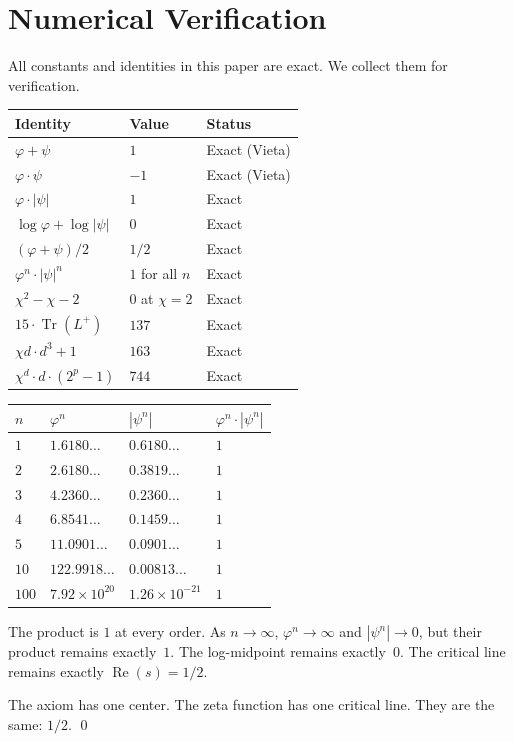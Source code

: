 \documentclass[12pt, a4paper]{article}
\theoremstyle{plain}
\theoremstyle{definition}
\theoremstyle{remark}
\newcommand{\re}{\operatorname{Re}}
\newcommand{\vp}{\varphi}
\newcommand{\Tr}{\operatorname{Tr}}
\begin{document}
\section{Numerical Verification}\label{sec:numerical}

All constants and identities in this paper are exact.  We collect them
for verification.

\begin{center}
\begin{tabular}{lll}
  \toprule
  \textbf{Identity} & \textbf{Value} & \textbf{Status} \\
  \midrule
  $\vp + \psi$ & $1$ & Exact (Vieta) \\
  $\vp \cdot \psi$ & $-1$ & Exact (Vieta) \\
  $\vp \cdot |\psi|$ & $1$ & Exact \\
  $\log \vp + \log |\psi|$ & $0$ & Exact \\
  $(\vp + \psi)/2$ & $1/2$ & Exact \\
  $\vp^n \cdot |\psi|^n$ & $1$ for all $n$ & Exact \\
  $\chi^2 - \chi - 2$ & $0$ at $\chi = 2$ & Exact \\
  $15 \cdot \Tr(L^+)$ & $137$ & Exact \\
  $\chi d \cdot d^3 + 1$ & $163$ & Exact \\
  $\chi^d \cdot d \cdot (2^p-1)$ & $744$ & Exact \\
  \bottomrule
\end{tabular}
\end{center}

\begin{center}
\begin{tabular}{llll}
  \toprule
  $n$ & $\vp^n$ & $|\psi^n|$ & $\vp^n \cdot |\psi^n|$ \\
  \midrule
  $1$ & $1.6180\ldots$ & $0.6180\ldots$ & $1$ \\
  $2$ & $2.6180\ldots$ & $0.3819\ldots$ & $1$ \\
  $3$ & $4.2360\ldots$ & $0.2360\ldots$ & $1$ \\
  $4$ & $6.8541\ldots$ & $0.1459\ldots$ & $1$ \\
  $5$ & $11.0901\ldots$ & $0.0901\ldots$ & $1$ \\
  $10$ & $122.9918\ldots$ & $0.00813\ldots$ & $1$ \\
  $100$ & $7.92 \times 10^{20}$ & $1.26 \times 10^{-21}$ & $1$ \\
  \bottomrule
\end{tabular}
\end{center}

\noindent
The product is $1$ at every order.  As $n \to \infty$,
$\vp^n \to \infty$ and $|\psi^n| \to 0$, but their product
remains exactly~$1$.  The log-midpoint remains exactly~$0$.
The critical line remains exactly $\re(s) = 1/2$.

\bigskip

The axiom has one center.  The zeta function has one critical line.
They are the same: $1/2$.  \qed
\end{document}
